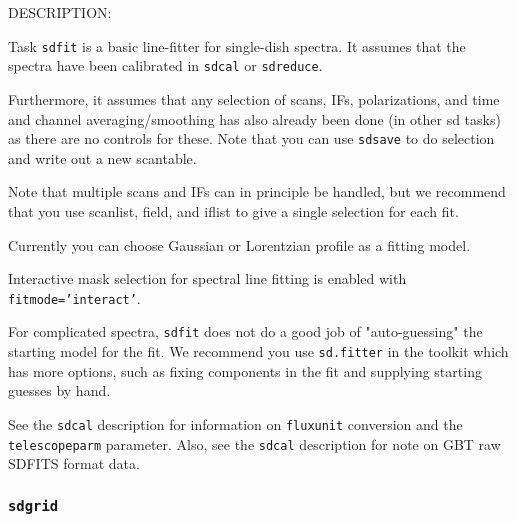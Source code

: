 DESCRIPTION:

Task {\tt sdfit} is a basic line-fitter for single-dish spectra.
It assumes that the spectra have been calibrated in {\tt sdcal}
or {\tt sdreduce}.

Furthermore, it assumes that any selection of scans, IFs,
polarizations, and time and channel averaging/smoothing has
also already been done (in other sd tasks) as there are no controls
for these.  Note that you can use {\tt sdsave} to do selection and write
out a new scantable.

Note that multiple scans and IFs can in principle be handled, but
we recommend that you use scanlist, field, and iflist to give a
single selection for each fit.

Currently you can choose Gaussian or Lorentzian profile as a fitting model.
    
Interactive mask selection for spectral line fitting is enabled with
{\tt fitmode='interact'}. 
    
For complicated spectra, {\tt sdfit} does not do a good job of
"auto-guessing" the starting model for the fit.  We recommend
you use {\tt sd.fitter} in the toolkit which has more options, such
as fixing components in the fit and supplying starting guesses
by hand.

See the {\tt sdcal} description for information on {\tt fluxunit} 
conversion and the {\tt telescopeparm} parameter.
Also, see the {\tt sdcal} description for note on GBT raw SDFITS format data.

\subsubsection{{\tt sdgrid}}
\label{section::sd.sdtasks.tasks.sdgrid}

